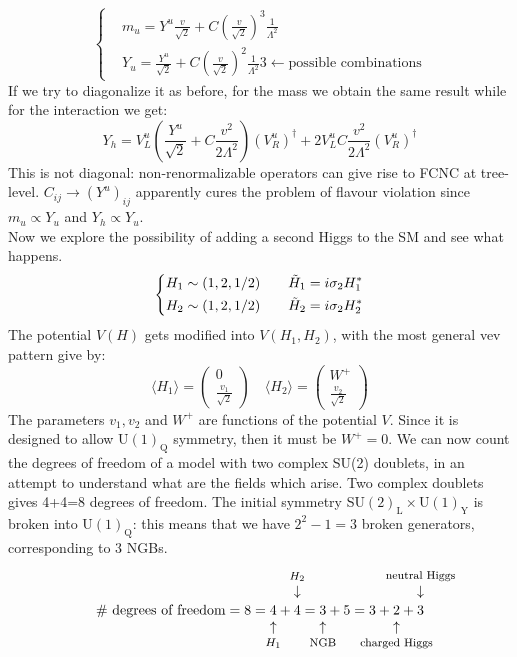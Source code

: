 \documentclass[../main.tex]{subfiles}
\begin{document}
\[
\left\{
\begin{aligned}
&m_u=Y^u\frac{v}{\sqrt{2}}+C\left(\frac{v}{\sqrt{2}}\right)^3\frac{1}{\Lambda^2}\\
&Y_u=\frac{Y^u}{\sqrt{2}}+C\left(\frac{v}{\sqrt{2}}\right)^2\frac{1}{\Lambda^2}3\xleftarrow[]{}\text{possible combinations}
\end{aligned}
\right.
\]
If we try to diagonalize it as before, for the mass we obtain the same result while for the interaction we get:
\[
Y_h=V_L^u\left(\frac{Y^u}{\sqrt{2}}+C\frac{v^2}{2\Lambda^2}\right)(V_R^u)^\dagger+2V_L^uC\frac{v^2}{2\Lambda^2}(V_R^u)^\dagger
\]
This is not diagonal: non-renormalizable operators can give rise to FCNC at tree-level. $C_{ij}\xrightarrow[]{}(Y^u)_{ij}$ apparently cures the problem of flavour violation since $m_u\propto Y_u$ and $Y_h\propto Y_u$.\\
Now we explore the possibility of adding a second Higgs to the SM and see what happens. 
\[
\left\{
\begin{aligned}
&H_1\sim(1,2,1/2) \quad &&\Tilde{H}_1=i\sigma_2H_1^*\\
&H_2\sim(1,2,1/2) \quad &&\Tilde{H}_2=i\sigma_2H_2^*
\end{aligned}
\right.
\]
The potential $V(H)$ gets modified into $V(H_1,H_2)$, with the most general vev pattern give by:
\[
\langle H_1 \rangle=\left(\begin{array}{c}
     0 \\
     \frac{v_1}{\sqrt{2}}
\end{array}\right)
\quad
\langle H_2 \rangle=\left(\begin{array}{c}
     W^+ \\
     \frac{v_2}{\sqrt{2}}
\end{array}\right)
\]
The parameters $v_1, v_2$ and $W^+$ are functions of the potential $V$. Since it is designed to allow U$(1)_{\text{Q}}$ symmetry, then it must be $W^+=0$. We can now count the degrees of freedom of a model with two complex SU(2) doublets, in an attempt to understand what are the fields which arise. Two complex doublets gives 4+4=8 degrees of freedom. The initial symmetry SU$(2)_{\text{L}}\times$U$(1)_{\text{Y}}$ is broken into U$(1)_{\text{Q}}$: this means that we have $2^2-1=3$ broken generators, corresponding to 3 NGBs.
\[
\text{\# degrees of freedom}=8=\underset{\mathclap{\tikz \node {$\uparrow$} node [below=1ex] {\footnotesize $H_1$ };}}{4}+\overset{\mathclap{\tikz \node {$\downarrow$} node [above=1ex] {\footnotesize $H_2$};}}{4}=\underset{\mathclap{\tikz \node {$\uparrow$} node [below=1ex] {\footnotesize  NGB};}}{3}+5=3+\underset{\mathclap{\tikz \node {$\uparrow$} node [below=1ex] {\footnotesize charged Higgs };}}{2}+\overset{\mathclap{\tikz \node {$\downarrow$} node [above=1ex] {\footnotesize neutral Higgs };}}3
\]
\end{document}
